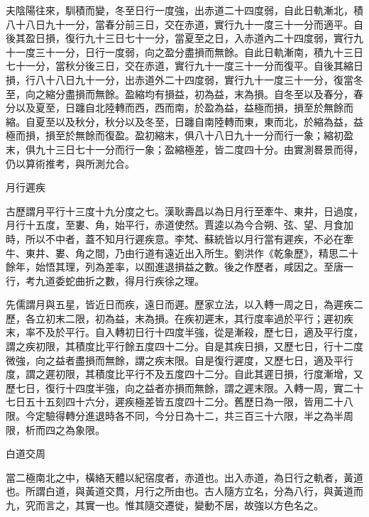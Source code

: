 \begin{pinyinscope}
 夫陰陽往來，馴積而變，冬至日行一度強，出赤道二十四度弱，自此日軌漸北，積八十八日九十一分，當春分前三日，交在赤道，實行九十一度三十一分而適平。自後其盈日損，復行九十三日七十一分，當夏至之日，入赤道內二十四度弱，實行九十一度三十一分，日行一度弱，向之盈分盡損而無餘。自此日軌漸南，積九十三日七十一分，當秋分後三日，交在赤道，實行九十一度三十一分而復平。自後其縮日損，行八十八日九十一分，出赤道外二十四度弱，實行九十一度三十一分，復當冬至，向之縮分盡損而無餘。盈縮均有損益，初為益，末為損。自冬至以及春分，春分以及夏至，日躔自北陸轉而西，西而南，於盈為益，益極而損，損至於無餘而縮。自夏至以及秋分，秋分以及冬至，日躔自南陸轉而東，東而北，於縮為益，益極而損，損至於無餘而復盈。盈初縮末，俱八十八日九十一分而行一象；縮初盈末，俱九十三日七十一分而行一象；盈縮極差，皆二度四十分。由實測晷景而得，仍以算術推考，與所測允合。



 月行遲疾



 古歷謂月平行十三度十九分度之七。漢耿壽昌以為日月行至牽牛、東井，日過度，月行十五度，至婁、角，始平行，赤道使然。賈逵以為今合朔、弦、望、月食加時，所以不中者，蓋不知月行遲疾意。李梵、蘇統皆以月行當有遲疾，不必在牽牛、東井、婁、角之間，乃由行道有遠近出入所生。劉洪作《乾象歷》，精思二十餘年，始悟其理，列為差率，以囿進退損益之數。後之作歷者，咸因之。至唐一行，考九道委蛇曲折之數，得月行疾徐之理。



 先儒謂月與五星，皆近日而疾，遠日而遲。歷家立法，以入轉一周之日，為遲疾二歷，各立初末二限，初為益，末為損。在疾初遲末，其行度率過於平行；遲初疾末，率不及於平行。自入轉初日行十四度半強，從是漸殺，歷七日，適及平行度，謂之疾初限，其積度比平行餘五度四十二分。自是其疾日損，又歷七日，行十二度微強，向之益者盡損而無餘，謂之疾末限。自是復行遲度，又歷七日，適及平行度，謂之遲初限，其積度比平行不及五度四十二分。自此其遲日損，行度漸增，又歷七日，復行十四度半強，向之益者亦損而無餘，謂之遲末限。入轉一周，實二十七日五十五刻四十六分，遲疾極差皆五度四十二分。舊歷日為一限，皆用二十八限。今定驗得轉分進退時各不同，今分日為十二，共三百三十六限，半之為半周限，析而四之為象限。



 白道交周



 當二極南北之中，橫絡天體以紀宿度者，赤道也。出入赤道，為日行之軌者，黃道也。所謂白道，與黃道交貫，月行之所由也。古人隨方立名，分為八行，與黃道而九，究而言之，其實一也。惟其隨交遷徙，變動不居，故強以方色名之。




\end{pinyinscope}
